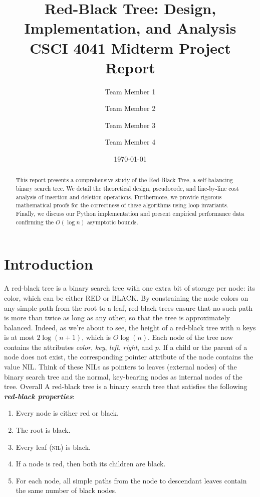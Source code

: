 \documentclass[11pt,a4paper]{article}
\title{\textbf{Red-Black Tree: Design, Implementation, and Analysis} \\ 
\large CSCI 4041 Midterm Project Report}
\author{
  Team Member 1 \and 
  Team Member 2 \and 
  Team Member 3 \and 
  Team Member 4
}
\date{\today}
\begin{document}
\maketitle

\begin{abstract}
This report presents a comprehensive study of the Red-Black Tree, a self-balancing binary search tree. We detail the theoretical design, pseudocode, and line-by-line cost analysis of insertion and deletion operations. Furthermore, we provide rigorous mathematical proofs for the correctness of these algorithms using loop invariants. Finally, we discuss our Python implementation and present empirical performance data confirming the $O(\log n)$ asymptotic bounds.
\end{abstract}

\section{Introduction}
A red-black tree is a binary search tree with one extra bit of storage per node: its color, which can be either RED or BLACK. By constraining the node colors on any simple path from the root to a leaf, red-black trees ensure that no such path is more than twice as long as any other, so that the tree is approximately balanced. Indeed, as we're about to see, the height of a red-black tree with $n$ keys is at most $2\log{(n+1)}$, which is $O\log{(n)}$. \newline
\indent Each node of the tree now contains the attributes \textit{color}, \textit{key}, \textit{left}, \textit{right}, and $p$. If a child or the parent of a node does not exist, the corresponding pointer attribute of the node contains the value NIL. Think of these NILs as pointers to leaves (external nodes) of the binary search tree and the normal, key-bearing nodes as internal nodes of the tree.\newline
\indent Overall A red-black tree is a binary search tree that satisfies the following \textbf{\textit{red-black properties}}:

\begin{enumerate}
    \item Every node is either red or black.
    \item The root is black.
    \item Every leaf (\textsc{nil}) is black.
    \item If a node is red, then both its children are black.
    \item For each node, all simple paths from the node to descendant leaves contain the same number of black nodes.
\end{enumerate}
\end{document}
